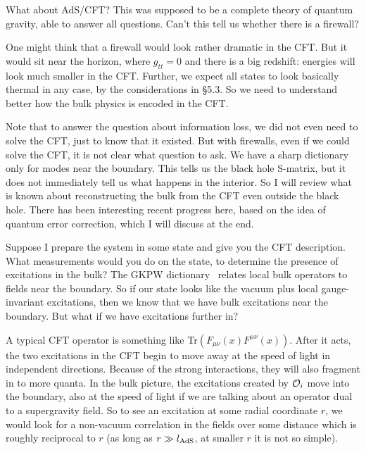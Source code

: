 \documentclass[12pt]{article}
\begin{document}
What about AdS/CFT?  This was supposed to be a complete theory of quantum gravity, able to answer all questions.  Can't this tell us whether there is a firewall?  

One might think that a firewall would look rather dramatic in the CFT.  But it would sit near the horizon, where $g_{tt} = 0$ and there is a big redshift: energies will look much smaller in the CFT.  Further, we expect all states to look basically thermal in any case, by the considerations in \S5.3.  So we need to understand better how the bulk physics is encoded in the CFT.

Note that to answer the question about information loss, we did not even need to solve the CFT, just to know that it existed.  But with firewalls, even if we could solve the CFT, it is not clear what question to ask.  We have a sharp dictionary only for modes near the boundary.  This tells us the black hole S-matrix, but it does not immediately tell us what happens in the interior.  So I will review what is known about reconstructing the bulk from the CFT even outside the black hole.  There has been interesting recent progress here, based on the idea of quantum error correction, which I will discuss at the end. 

Suppose I prepare the system in some state and give you the CFT description.  What measurements would you do on the state, to determine the presence of excitations in the bulk?  The GKPW dictionary~\cite{GKP,W} relates local bulk operators to fields near the boundary.  So if our state looks like the vacuum plus local gauge-invariant excitations, then we know that we have bulk excitations near the boundary.  But what if we have excitations further in? 

A typical CFT operator is something like Tr$(F_{\mu\nu}(x) F^{\mu\nu}(x))$.  After it acts, the two excitations in the CFT begin to move away at the speed of light in independent directions.  Because of the strong interactions, they will also fragment in to more quanta.  In the bulk picture, the excitations created by ${\cal O}_i$ move into the boundary, also at the speed of light if we are talking about an operator dual to a supergravity field.  So to see an excitation at some radial coordinate $r$, we would look for a non-vacuum correlation in the fields over some distance which is roughly reciprocal to $r$ (as long as $r \gg l_{\rm AdS}$, at smaller $r$ it is not so simple).
\end{document}
